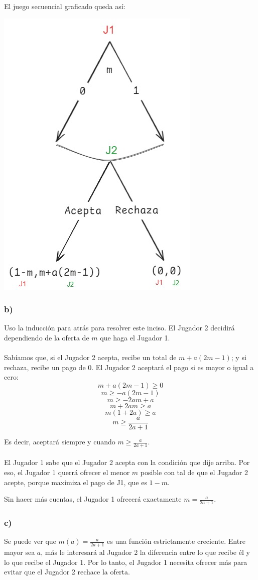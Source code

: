 \documentclass{article}
\begin{document}
                El juego secuencial graficado queda así:
                \begin{center}
                    \includegraphics[width=0.4 \linewidth]{figs/fig16.jpeg}
                \end{center}

            \subsubsection*{b)}
                Uso la inducción para atrás para resolver este inciso. El Jugador 2 decidirá dependiendo de la oferta de $m$ que haga el Jugador 1.
                \\
                \\
                Sabíamos que, si el Jugador 2 acepta, recibe un total de $m+a(2m-1)$; y si rechaza, recibe un pago de $0$. El Jugador 2 aceptará el pago si es mayor o igual a cero:
                \[m+a(2m-1) \geq 0\]
                \[m \geq -a(2m-1)\]
                \[m \geq -2am+a\]
                \[m+2am \geq a\]
                \[m(1+2a) \geq a\]
                \[m \geq \frac{a}{2a+1}\]

                Es decir, aceptará siempre y cuando $m \geq \frac{a}{2a+1}$.
                \\
                \\
                El Jugador 1 sabe que el Jugador 2 acepta con la condición que dije arriba. Por eso, el Jugador 1 querrá ofrecer el menor $m$ posible con tal de que el Jugador 2 acepte, porque maximiza el pago de J1, que es $1-m$.

                Sin hacer más cuentas, el Jugador 1 ofrecerá exactamente $m = \frac{a}{2a+1}$.

            \subsubsection*{c)}
                Se puede ver que $m(a) = \frac{a}{2a+1}$ es una función estrictamente creciente. Entre mayor sea $a$, más le interesará al Jugador 2 la diferencia entre lo que recibe él y lo que recibe el Jugador 1. Por lo tanto, el Jugador 1 necesita ofrecer más para evitar que el Jugador 2 rechace la oferta.
\end{document}
